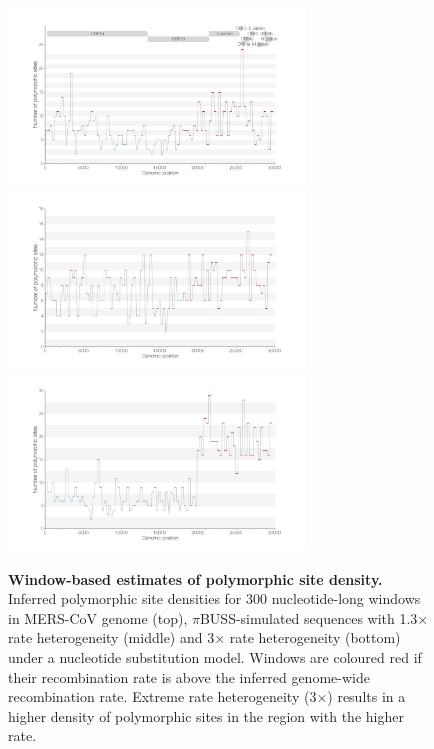 \documentclass[11pt,oneside,letterpaper]{article}
\begin{document}
\begin{figure}[h]
	\centering	
	\includegraphics[width=0.7\textwidth]{figures/supp_MERS_LDhat_windowSNPs.png}
	\includegraphics[width=0.7\textwidth]{figures/supp_pibuss_1.3_LDhat_windowSNPs.png}
	\includegraphics[width=0.7\textwidth]{figures/supp_pibuss_3_LDhat_windowSNPs.png}
	\caption{\textbf{Window-based estimates of polymorphic site density.}
Inferred polymorphic site densities for 300 nucleotide-long windows in MERS-CoV genome (top), $\pi$BUSS-simulated sequences with 1.3$\times$ rate heterogeneity (middle) and 3$\times$ rate heterogeneity (bottom) under a nucleotide substitution model.
Windows are coloured red if their recombination rate is above the inferred genome-wide recombination rate.
Extreme rate heterogeneity (3$\times$) results in a higher density of polymorphic sites in the region with the higher rate.}
	\label{SNPs}
\end{figure}
\end{document}
